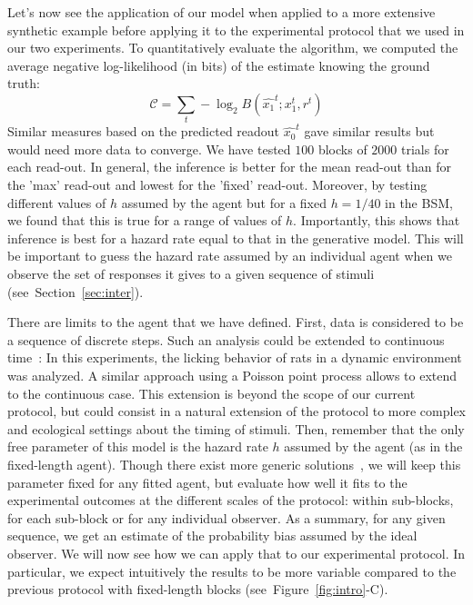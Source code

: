 \documentclass[12pt,english]{article}%
\newcommand{\eql}[1]{\begin{equation}#1\end{equation}}
\newcommand{\Cc}{\mathcal{C}}
\newcommand{\citep}[1]{\parencite{#1}}
\newcommand{\seeFig}[1]{Figure~\ref{fig:#1}}
\newcommand{\seeSec}[1]{Section~\ref{sec:#1}}
\begin{document}
Let's now see the application of our model when applied
to a more extensive synthetic example before applying it to the experimental protocol
that we used in our two experiments.
To quantitatively evaluate the algorithm,
we computed the average negative log-likelihood (in bits) of the estimate
knowing the ground truth:
\eql{
\Cc =  \sum_{t} -\log_2 B(\hat{x_1}^t ; x_1^t, r^t )
}
Similar measures based on the predicted readout $\hat{x_0}^t$
gave similar results but would need more data to converge.
We have tested $100$ blocks of $2000$ trials for each read-out.
In general, the inference is better for the mean read-out
than for the 'max' read-out and lowest for the 'fixed' read-out.
Moreover, by testing different values of $h$ assumed by the agent
but for a fixed $h=1/40$ in the BSM,
we found that this is true for a range of values of $h$.
Importantly, this shows that inference is best for a hazard rate
equal to that in the generative model.
This will be important to guess the hazard rate assumed by an individual agent
when we observe the set of responses it gives to a given sequence of stimuli
(see~\seeSec{inter}).

There are limits to the agent that we have defined.
First, data is considered to be a sequence of discrete steps.
Such an analysis could be extended to continuous time~\citep{RadilloBrady2017}:
In this experiments, the licking behavior of rats in a dynamic environment
was analyzed.
A similar approach using a Poisson point process allows to extend to the continuous case.
This extension is beyond the scope of our current protocol,
but could consist in a natural extension of the protocol
to more complex and ecological settings about the timing of stimuli.
Then, remember that the only free parameter of this model is the hazard rate $h$
assumed by the agent (as in the fixed-length agent).
Though there exist more generic solutions~\citep{Wilson13,Wilson18},
we will keep this parameter fixed for any fitted agent, but evaluate
how well it fits to the experimental outcomes at the different scales of the protocol:
within sub-blocks, for each sub-block or for any individual observer.
As a summary, for any given sequence,
we get an estimate of the probability bias assumed  by the ideal observer.
We will now see how we can apply that to our experimental protocol.
In particular, we expect intuitively the results to be more variable
compared to the previous protocol with fixed-length blocks (see~\seeFig{intro}-C).
\end{document}
